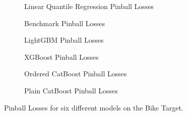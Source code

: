 \begin{figure}[htbp]
    \centering
    \begin{subfigure}[b]{0.5\textwidth}
        \centering
        
        \caption{Linear Quantile Regression Pinball Losses}
        \label{fig:small-orfe-pinball-bikes}
    \end{subfigure}%
    \begin{subfigure}[b]{0.5\textwidth}
        \centering
        
        \caption{Benchmark Pinball Losses}
        \label{fig:armed-play-pinball-bikes}
    \end{subfigure}
    
    \begin{subfigure}[b]{0.5\textwidth}
        \centering
        
        \caption{LightGBM Pinball Losses}
        \label{fig:mangy-flux-pinball-bikes}
    \end{subfigure}%
    \begin{subfigure}[b]{0.5\textwidth}
        \centering
        
        \caption{XGBoost Pinball Losses}
        \label{fig:couth-ruby-pinball-bikes}
    \end{subfigure}
    
    \begin{subfigure}[b]{0.5\textwidth}
        \centering
        
        \caption{Ordered CatBoost Pinball Losses}
        \label{fig:civil-leas-pinball-bikes}
    \end{subfigure}%
    \begin{subfigure}[b]{0.5\textwidth}
        \centering
        
        \caption{Plain CatBoost Pinball Losses}
        \label{fig:blear-dita-pinball-bikes}
    \end{subfigure}
    
    \caption{Pinball Losses for six different models on the Bike Target.}
    \label{fig:bikes_pinball}
\end{figure}